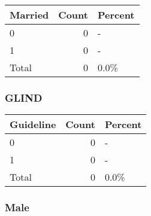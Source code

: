 \documentclass[]{article}
\newenvironment{Shaded}{\begin{snugshade}}{\end{snugshade}}
\newcommand{\DataTypeTok}[1]{\textcolor[rgb]{0.13,0.29,0.53}{#1}}
\newcommand{\KeywordTok}[1]{\textcolor[rgb]{0.13,0.29,0.53}{\textbf{#1}}}
\newcommand{\NormalTok}[1]{#1}
\newcommand{\OperatorTok}[1]{\textcolor[rgb]{0.81,0.36,0.00}{\textbf{#1}}}
\newcommand{\OtherTok}[1]{\textcolor[rgb]{0.56,0.35,0.01}{#1}}
\newcommand{\StringTok}[1]{\textcolor[rgb]{0.31,0.60,0.02}{#1}}
\begin{document}
\begin{table}[H]
\centering
\begin{tabular}{l|r|l}
\hline
Married & Count & Percent\\
\hline
0 & 0 & -\\
\hline
1 & 0 & -\\
\hline
Total & 0 & 0.0\%\\
\hline
\end{tabular}
\end{table}

\hypertarget{glind-2}{%
\subsubsection{GLIND}\label{glind-2}}

\begin{Shaded}
\end{Shaded}

\begin{table}[H]
\centering
\begin{tabular}{l|r|l}
\hline
Guideline & Count & Percent\\
\hline
0 & 0 & -\\
\hline
1 & 0 & -\\
\hline
Total & 0 & 0.0\%\\
\hline
\end{tabular}
\end{table}

\hypertarget{male-3}{%
\subsubsection{Male}\label{male-3}}
\end{document}
